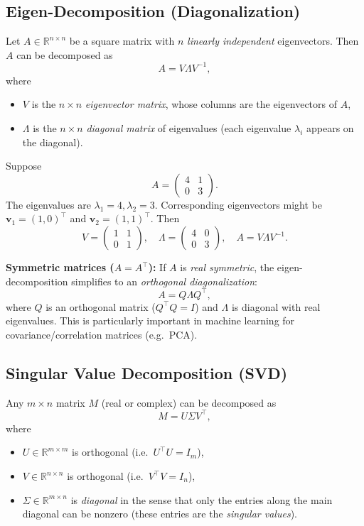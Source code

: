 \subsection{Eigen-Decomposition (Diagonalization)}
\begin{theorem}
Let $A \in \mathbb{R}^{n \times n}$ be a square matrix with $n$ \emph{linearly independent} eigenvectors. 
Then $A$ can be decomposed as
\[
A = V \Lambda V^{-1},
\]
where 
\begin{itemize}
    \item $V$ is the $n \times n$ \emph{eigenvector matrix}, whose columns are the eigenvectors of $A$,
    \item $\Lambda$ is the $n \times n$ \emph{diagonal matrix} of eigenvalues (each eigenvalue $\lambda_i$ 
          appears on the diagonal).
\end{itemize}
\end{theorem}

\begin{example}
Suppose 
\[
A = \begin{pmatrix}
4 & 1 \\
0 & 3
\end{pmatrix}.
\]
The eigenvalues are $\lambda_1 = 4, \lambda_2 = 3$. 
Corresponding eigenvectors might be $\mathbf{v}_1 = (1,0)^\top$ and $\mathbf{v}_2=(1,1)^\top$. 
Then 
\[
V = \begin{pmatrix} 1 & 1 \\ 0 & 1 \end{pmatrix},
\quad
\Lambda = \begin{pmatrix} 4 & 0 \\ 0 & 3 \end{pmatrix},
\quad
A = V \Lambda V^{-1}.
\]
\end{example}

\textbf{Symmetric matrices ($A = A^\top$):} 
If $A$ is \emph{real symmetric}, the eigen-decomposition simplifies to an \emph{orthogonal diagonalization}:
\[
A = Q \Lambda Q^\top,
\]
where $Q$ is an orthogonal matrix ($Q^\top Q = I$) and $\Lambda$ is diagonal with real eigenvalues. 
This is particularly important in machine learning for covariance/correlation matrices (e.g.\ PCA).

\subsection{Singular Value Decomposition (SVD)}
\begin{theorem}
Any $m \times n$ matrix $M$ (real or complex) can be decomposed as
\[
M = U \Sigma V^\top,
\]
where
\begin{itemize}
    \item $U \in \mathbb{R}^{m \times m}$ is orthogonal (i.e.\ $U^\top U = I_m$),
    \item $V \in \mathbb{R}^{n \times n}$ is orthogonal (i.e.\ $V^\top V = I_n$),
    \item $\Sigma \in \mathbb{R}^{m \times n}$ is \emph{diagonal} in the sense that only the entries 
          along the main diagonal can be nonzero (these entries are the \emph{singular values}).
\end{itemize}
\end{theorem}

